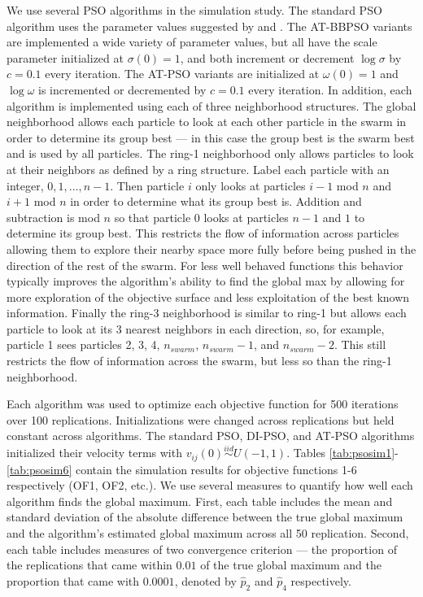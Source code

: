 \documentclass[12pt]{article}
\begin{document}
\begin{appendix}
We use several PSO algorithms in the simulation study. The standard PSO algorithm uses the parameter values suggested by \cite{blum2008swarm} and \cite{clerc2002particle}. The AT-BBPSO variants are implemented a wide variety of parameter values, but all have the scale parameter initialized at $\sigma(0)=1$, and both increment or decrement $\log\sigma$ by $c=0.1$ every iteration. The AT-PSO variants are initialized at $\omega(0)=1$ and $\log\omega$ is incremented or decremented by $c=0.1$ every iteration. In addition, each algorithm is implemented using each of three neighborhood structures. The global neighborhood allows each particle to look at each other particle in the swarm in order to determine its group best --- in this case the group best is the swarm best and is used by all particles. The ring-1 neighborhood only allows particles to look at their neighbors as defined by a ring structure. Label each particle with an integer, $0, 1, \dots, n-1$. Then particle $i$ only looks at particles $i-1$ mod $n$ and $i+1$ mod $n$ in order to determine what its group best is. Addition and subtraction is mod $n$ so that particle $0$ looks at particles $n-1$ and $1$ to determine its group best. This restricts the flow of information across particles allowing them to explore their nearby space more fully before being pushed in the direction of the rest of the swarm. For less well behaved functions this behavior typically improves the algorithm's ability to find the global max by allowing for more exploration of the objective surface and less exploitation of the best known information. Finally the ring-3 neighborhood is similar to ring-1 but allows each particle to look at its 3 nearest neighbors in each direction, so, for example, particle 1 sees particles 2, 3, 4, $n_{swarm}$, $n_{swarm} -1$, and $n_{swarm}-2$. This still restricts the flow of information across the swarm, but less so than the ring-1 neighborhood. 

Each algorithm was used to optimize each objective function for 500 iterations over 100 replications. Initializations were changed across replications but held constant across algorithms. The standard PSO, DI-PSO, and AT-PSO algorithms initialized their velocity terms with $v_{ij}(0)\stackrel{iid}{\sim}U(-1,1)$. Tables \ref{tab:psosim1}-\ref{tab:psosim6} contain the simulation results for objective functions 1-6 respectively (OF1, OF2, etc.). We use several measures to quantify how well each algorithm finds the global maximum. First, each table includes the mean and standard deviation of the absolute difference between the true global maximum and the algorithm's estimated global maximum across all 50 replication. Second, each table includes measures of two convergence criterion --- the proportion of the replications that came within $0.01$ of the true global maximum and the proportion that came with $0.0001$, denoted by $\widehat{p}_2$ and $\widehat{p}_4$ respectively. 


\end{appendix}
\end{document}
